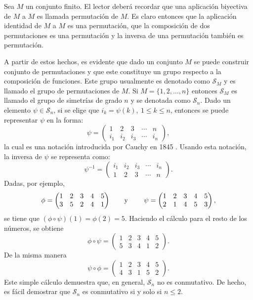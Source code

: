 \begin{ejemplo}\label{ejemplo:simetrias}
Sea $M$ un conjunto finito. El lector deberá recordar que una aplicación biyectiva de $M$ a $M$ es llamada permutación de $M$. Es claro entonces que la aplicación identidad de $M$ a $M$ es una permutación, que la composición de dos permutaciones es una permutación y la inversa de una permutación también es permutación. 

A partir de estos hechos, es evidente que dado un conjunto $M$ se puede construir conjunto de permutaciones y que este constituye un grupo respecto a la composición de funciones. Este grupo usualmente es denotado como $\mathcal{S}_M$ y es llamado el grupo de permutaciones de $M$. 
Si $M = \{  1,2,\dots, n \}$ entonces $\mathcal{S}_M$ es llamado el grupo de simetrías de grado $n$ y se denotada como $\mathcal{S}_n$. Dado un elemento $\psi \in \mathcal{S}_n$, si se elige que $i_k = \psi (k), \ 1 \leq k \leq n$, entonces se puede representar $\psi$ en la forma:
\[ \psi = \begin{pmatrix}
1 & 2 & 3 & \cdots & n \\
i_1 & i_2 & i_3 & \cdots & i_n
\end{pmatrix}, \]
la cual es una notación introducida por Cauchy en 1845 \cite[64-90]{bib:Cauchy}. Usando esta notación, la inversa de $\psi$ se representa como: \[ \psi^{-1} = \begin{pmatrix}
i_1 & i_2 & i_3 & \cdots & i_n \\
1 & 2 & 3 & \cdots & n
\end{pmatrix}.
 \]
 Dadas, por ejemplo, \[ \phi = \begin{pmatrix}
 1 & 2 & 3 & 4 & 5 \\
 3 & 5 & 2 & 4 & 1
 \end{pmatrix} \mbox{\qquad y \qquad } \psi = \begin{pmatrix}
 1 & 2 & 3 & 4 & 5 \\
  2 & 1 & 4 & 5 & 3
 \end{pmatrix}, \]
 se tiene que $(\phi \circ \psi)(1) = \phi(2) = 5$. Haciendo el cálculo para el resto de los números, se obtiene \[ \phi \circ \psi = \begin{pmatrix}
 1 & 2 & 3 & 4 & 5 \\
  5 & 3 & 4 & 1 & 2
 \end{pmatrix}. \]
 De la misma manera \[ \psi \circ \phi = \begin{pmatrix}
 1 & 2 & 3 & 4 & 5 \\
  4 & 3 & 1 & 5 & 2
 \end{pmatrix}. \]
\newpage Este simple cálculo demuestra que, en general, $\mathcal{S}_n$ no es conmutativo. De hecho, es fácil demostrar que $\mathcal{S}_n$ es conmutativo si y solo si $n \leq 2$. 
\end{ejemplo}
